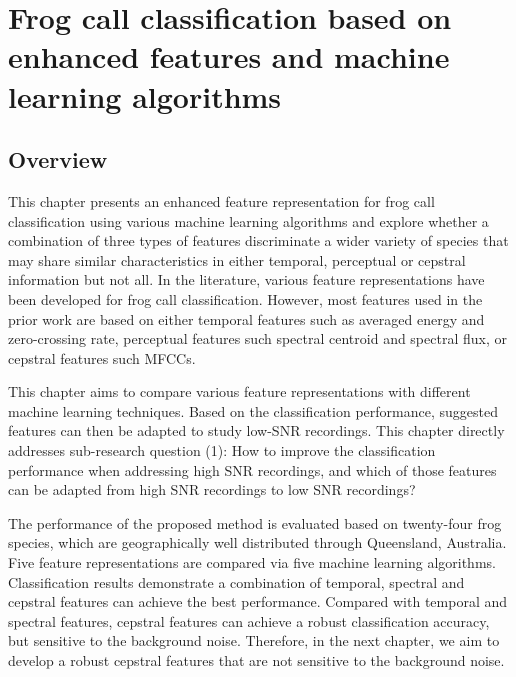 
\chapter[Frog call classification based on enhanced features]{Frog call classification based on enhanced features and machine learning algorithms}
\label{cha:cha4EnhancedFeature}



\section{Overview}
\label{S:1}

This chapter presents an enhanced feature representation for frog call classification using various machine learning algorithms and explore whether a combination of three types of features discriminate a wider variety of species that may share similar characteristics in either temporal, perceptual or cepstral information but not all. In the literature, various feature representations have been developed for frog call classification. However, most features used in the prior work are based on either temporal features such as averaged energy and zero-crossing rate, perceptual features such spectral centroid and spectral flux, or cepstral features such MFCCs. 



This chapter aims to compare various feature representations with different machine learning techniques. Based on the classification performance, suggested features can then be adapted to study low-SNR recordings. This chapter directly addresses sub-research question (1): How to improve the classification performance when addressing high SNR recordings, and which of those features can be adapted from high SNR recordings to low SNR recordings?

The performance of the proposed method is evaluated based on twenty-four frog species, which are geographically well distributed through Queensland, Australia. Five feature representations are compared via five machine learning algorithms. Classification results demonstrate a combination of temporal, spectral and cepstral features can achieve the best performance. Compared with temporal and spectral features, cepstral features can achieve a robust classification accuracy, but sensitive to the background noise. Therefore, in the next chapter, we aim to develop a robust cepstral features that are not sensitive to the background noise.



